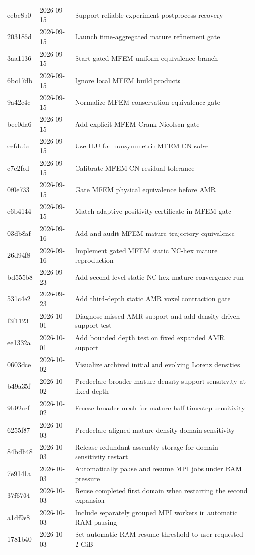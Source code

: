 \begin{longtable}{p{}p{}p{}}
eebc8b0 & 2026-09-15 & Support reliable experiment postprocess recovery\\
203186d & 2026-09-15 & Launch time-aggregated mature refinement gate\\
3aa1136 & 2026-09-15 & Start gated MFEM uniform equivalence branch\\
6bc17db & 2026-09-15 & Ignore local MFEM build products\\
9a42c4c & 2026-09-15 & Normalize MFEM conservation equivalence gate\\
bee0da6 & 2026-09-15 & Add explicit MFEM Crank Nicolson gate\\
cefdc4a & 2026-09-15 & Use ILU for nonsymmetric MFEM CN solve\\
c7c2fcd & 2026-09-15 & Calibrate MFEM CN residual tolerance\\
0f0e733 & 2026-09-15 & Gate MFEM physical equivalence before AMR\\
e6b4144 & 2026-09-15 & Match adaptive positivity certificate in MFEM gate\\
03db8af & 2026-09-16 & Add and audit MFEM mature trajectory equivalence\\
26d94f8 & 2026-09-16 & Implement gated MFEM static NC-hex mature reproduction\\
bd555b8 & 2026-09-23 & Add second-level static NC-hex mature convergence run\\
531c4e2 & 2026-09-23 & Add third-depth static AMR voxel contraction gate\\
f3f1123 & 2026-10-01 & Diagnose missed AMR support and add density-driven support test\\
ee1332a & 2026-10-01 & Add bounded depth test on fixed expanded AMR support\\
0603dce & 2026-10-02 & Visualize archived initial and evolving Lorenz densities\\
b49a35f & 2026-10-02 & Predeclare broader mature-density support sensitivity at fixed depth\\
9b92ecf & 2026-10-02 & Freeze broader mesh for mature half-timestep sensitivity\\
6255f87 & 2026-10-03 & Predeclare aligned mature-density domain sensitivity\\
84bdb48 & 2026-10-03 & Release redundant assembly storage for domain sensitivity restart\\
7e9141a & 2026-10-03 & Automatically pause and resume MPI jobs under RAM pressure\\
37f6704 & 2026-10-03 & Reuse completed first domain when restarting the second expansion\\
a1df9e8 & 2026-10-03 & Include separately grouped MPI workers in automatic RAM pausing\\
1781b40 & 2026-10-03 & Set automatic RAM resume threshold to user-requested 2 GiB\\
\bottomrule\end{longtable}\normalsize
